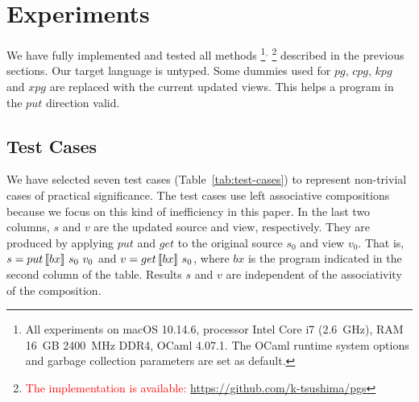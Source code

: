 \section{Experiments} \label{sect:experiments}

We have fully implemented and tested all methods%
%
\footnote{All experiments on macOS 10.14.6, processor Intel Core i7 (2.6~GHz), RAM 16~GB 2400~MHz DDR4, OCaml 4.07.1. The OCaml runtime system options and garbage collection parameters are set as default.}$^,$%
%
\footnote{\textcolor{red}{The implementation is available:} \url{https://github.com/k-tsushima/pgs}}
%
described in the previous sections. Our target language is untyped. Some dummies used for $pg$, $cpg$, $kpg$ and $xpg$ are replaced with the current updated views. This helps a program in the $put$ direction valid.

\subsection{Test Cases}

We have 
selected seven test cases (Table~\ref{tab:test-cases}) to 
represent
non-trivial cases of practical significance.
The test cases use
left associative compositions because we focus on this kind of inefficiency in this paper.
In the last two columns, $s$ and $v$ are the updated source and view, respectively. They are produced by applying $put$ and $get$ to the original source $s_0$ and view $v_0$. That is, $s = put \, [\![bx]\!] \ s_0 \ v_0$ and $v = get \, [\![bx]\!] \ s_0$, where $bx$ is the program indicated in the second column of the table. 
Results $s$ and $v$ are independent of the associativity 
of the composition.

